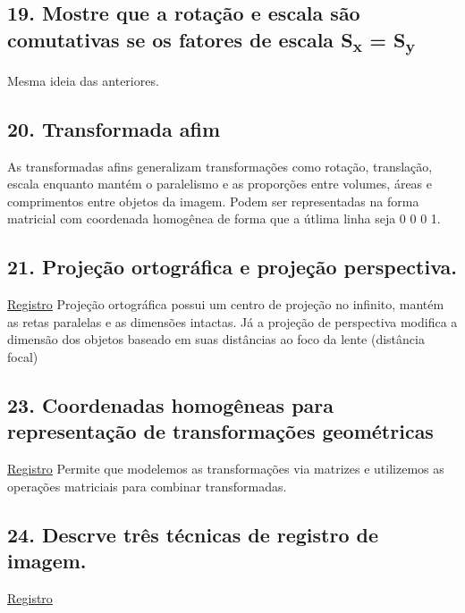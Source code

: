 \documentclass[twocolumn, 9pt]{article}
\begin{document}
\subsection*{19. Mostre que a rotação e escala são comutativas se os fatores de escala S\textsubscript{x} = S\textsubscript{y}}
\label{sec:org2826976}
Mesma ideia das anteriores.
\subsection*{20. Transformada afim}
\label{sec:org9a60db3}
As transformadas afins generalizam transformações como rotação, translação, escala enquanto mantém o paralelismo e as proporções entre volumes, áreas e comprimentos entre objetos da imagem. Podem ser representadas na forma matricial com coordenada homogênea de forma que a útlima linha seja 0 0 0 1.
\subsection*{21. Projeção ortográfica e projeção perspectiva.}
\label{sec:orgc43ae95}
\hyperref[sec:org0e52fa1]{Registro}
Projeção ortográfica possui um centro de projeção no infinito, mantém as retas paralelas e as dimensões intactas.
Já a projeção de perspectiva modifica a dimensão dos objetos baseado em suas distâncias ao foco da lente (distância focal)
\subsection*{23. Coordenadas homogêneas para representação de transformações geométricas}
\label{sec:org2d2c35b}
\hyperref[sec:org0e52fa1]{Registro}
Permite que modelemos as transformações via matrizes e utilizemos as operações matriciais para combinar transformadas.
\subsection*{24. Descrve três técnicas de registro de imagem.}
\label{sec:org4825e4b}
\hyperref[sec:org0e52fa1]{Registro}
\end{document}
